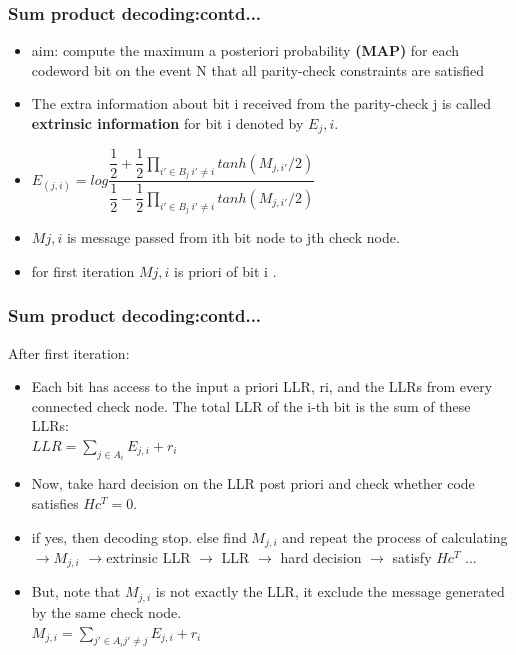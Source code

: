 \documentclass[xcolor=dvipsname]
{beamer}
\begin{document}
\begin{frame}[t] 
\frametitle{Sum product decoding:contd...}
\begin{itemize}
\item aim: compute the maximum a posteriori
probability \textbf{(MAP)} for each codeword bit on the event N that all
parity-check constraints are satisfied
\item The extra information about bit i received
from the parity-check j is called \textbf{extrinsic information} for bit i denoted by $E_j,i$.
\item $E_{(j,i)} = log\dfrac{\dfrac{1}{2}+\dfrac{1}{2} \prod_{i'\in B_j \ i'\neq i }tanh(M_{j,i'}/2) }{\dfrac{1}{2}-\dfrac{1}{2} \prod_{i'\in B_j \ i'\neq i }tanh(M_{j,i'}/2) }  $
\item $Mj,i $ is message passed from ith bit node to jth check node.
\item for first iteration $Mj,i $ is priori of bit i .\\
\end{itemize}         
\end{frame}

\begin{frame}[t] 
\frametitle{Sum product decoding:contd...}
After first iteration:
\begin{itemize}
\item Each bit has access to the input a priori LLR, ri, and the LLRs from every
connected check node. The total LLR of the i-th bit is the sum of these LLRs: \\
$ LLR = \sum_{j\in A_i} E_{j,i} + r_i  $
\item Now, take hard decision on the LLR post priori and check whether code satisfies $Hc^T=0$.
\item if yes, then decoding stop. else find $M_{j,i}$ and repeat the process of calculating$\rightarrow M_{j,i}$ $\rightarrow$extrinsic LLR $\rightarrow $ LLR $\rightarrow$ hard decision $\rightarrow$ satisfy $Hc^T$ ...
\item But, note that $M_{j,i}$ is not exactly the LLR, it exclude the message generated by the same check node.\\
$  M_{j,i} = \sum_{j'\in A_i j'\neq j} E_{j,i} + r_i $
\end{itemize}         
\end{frame}
\end{document}
